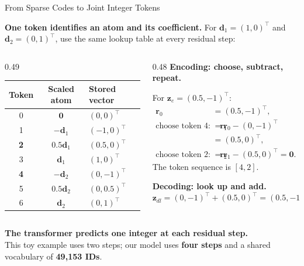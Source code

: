 \begin{frame}{From Sparse Codes to Joint Integer Tokens}
\small

\textbf{One token identifies an atom and its coefficient.}
For $\boldsymbol d_1=(1,0)^\top$ and
$\boldsymbol d_2=(0,1)^\top$, use the same lookup table
at every residual step:

\medskip
\begin{columns}[T,onlytextwidth]
\begin{column}{0.49\textwidth}
\centering
\renewcommand{\arraystretch}{1.2}
\begin{tabular}{ccl}
\hline
Token & Scaled atom & Stored vector \\
\hline
0 & $\boldsymbol 0$        & $(0,0)^\top$ \\
1 & $-\boldsymbol d_1$     & $(-1,0)^\top$ \\
\textbf{2} & $0.5\boldsymbol d_1$ & $(0.5,0)^\top$ \\
3 & $\boldsymbol d_1$      & $(1,0)^\top$ \\
\textbf{4} & $-\boldsymbol d_2$   & $(0,-1)^\top$ \\
5 & $0.5\boldsymbol d_2$   & $(0,0.5)^\top$ \\
6 & $\boldsymbol d_2$      & $(0,1)^\top$ \\
\hline
\end{tabular}
\end{column}

\begin{column}{0.48\textwidth}
\textbf{Encoding: choose, subtract, repeat.}

For $\boldsymbol z_e=(0.5,-1)^\top$:
\begin{align*}
\boldsymbol r_0 &= (0.5,-1)^\top,\\
\text{choose token }4:\quad
\boldsymbol r_1
&= \boldsymbol r_0-(0,-1)^\top\\
&= (0.5,0)^\top,\\
\text{choose token }2:\quad
\boldsymbol r_2
&= \boldsymbol r_1-(0.5,0)^\top
= \boldsymbol 0.
\end{align*}
The token sequence is $\boxed{[4,2]}$.

\medskip
\textbf{Decoding: look up and add.}
\[
\boldsymbol z_{dl}
= (0,-1)^\top+(0.5,0)^\top
= (0.5,-1)^\top.
\]
\end{column}
\end{columns}

\medskip
\textbf{The transformer predicts one integer at each residual step.}\\
This toy example uses two steps; our model uses
\textbf{four steps} and a shared vocabulary of \textbf{49,153 IDs}.

\end{frame}
